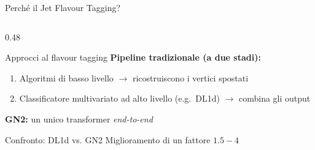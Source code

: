 \documentclass[aspectratio=169, 10pt]{beamer}
\begin{document}
\begin{frame}{Perché il Jet Flavour Tagging?}
\begin{columns}[T]
\begin{column}{0.48\textwidth}
\begin{block}{Approcci al flavour tagging}
                \textbf{Pipeline tradizionale (a due stadi):}
                \begin{enumerate}
                    \item Algoritmi di basso livello $\rightarrow$ ricostruiscono i
                          vertici spostati
                    \item Classificatore multivariato ad alto livello
                          (e.g.\ DL1d) $\rightarrow$ combina gli output
                \end{enumerate}
                \vspace{4pt}
                \textbf{GN2:} un unico transformer \textit{end-to-end}
            \end{block}
            \begin{alertblock}{Confronto: DL1d vs. GN2}
                Miglioramento di un fattore $1.5-4$
            \end{alertblock}
        \end{column}
    \end{columns}
\end{frame}
\end{document}
